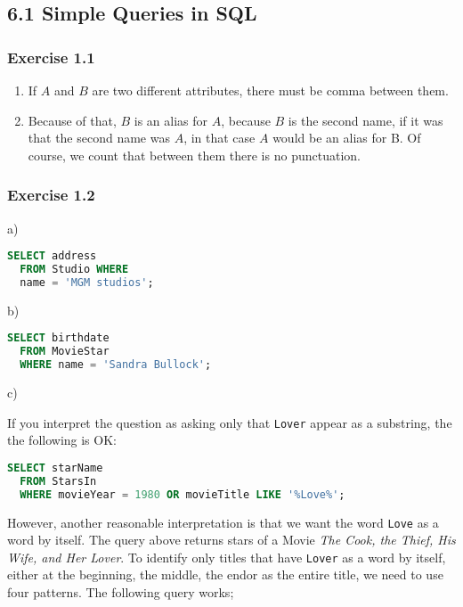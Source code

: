 \subsection*{6.1 Simple Queries in SQL}

\subsubsection*{Exercise 1.1}

\begin{enumerate}
  \item If $A$ and $B$ are two different attributes, there
        must be comma between them.
  \item Because of that, $B$ is an alias for $A$, because
        $B$ is the second name, if it was that the second
        name was $A$, in that case $A$ would be an alias
        for B. Of course, we count that between them there
        is no punctuation.
\end{enumerate}

\subsubsection*{Exercise 1.2}


a)

\begin{lstlisting}[language=sql]
  SELECT address
  FROM Studio WHERE
  name = 'MGM studios';
\end{lstlisting}

b)

\begin{lstlisting}[language=sql]
  SELECT birthdate
  FROM MovieStar
  WHERE name = 'Sandra Bullock';
\end{lstlisting}

\hypertarget{Solution6.1.2c}{c)}

If you interpret the question as asking only that \verb|Lover|
appear as a substring, the the following is OK:

\begin{lstlisting}[language=sql]
  SELECT starName
  FROM StarsIn
  WHERE movieYear = 1980 OR movieTitle LIKE '%Love%';
\end{lstlisting}

However, another reasonable interpretation is that we want
the word \verb|Love| as a word by itself. The query above
returns stars of a Movie \emph{The Cook, the Thief, His
Wife, and Her Lover}. To identify only titles that have
\verb|Lover| as a word by itself, either at the beginning,
the middle, the endor as the entire title, we need to use
four patterns. The following query works;

